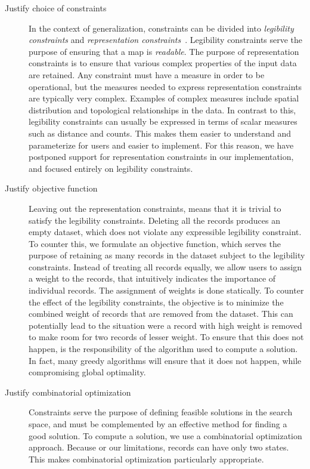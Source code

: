 \documentclass[11pt, oneside]{article}   	%
\begin{document}
\begin{description}
\item[Justify choice of constraints] 
In the context of generalization, constraints can be divided into \emph{legibility constraints} and \emph{representation constraints}~\cite{harrie2007modelling}. Legibility constraints serve the purpose of ensuring that a map is \emph{readable}. The purpose of representation constraints is to ensure that various complex properties of the input data are retained. Any constraint must have a measure in order to be operational, but the measures needed to express representation constraints are typically very complex. Examples of complex measures include spatial distribution and topological relationships in the data. In contrast to this, legibility constraints can usually be expressed in terms of scalar measures such as distance and counts. This makes them easier to understand and parameterize for users and easier to implement. For this reason, we have postponed support for representation constraints in our implementation, and focused entirely on legibility constraints.

\item[Justify objective function] Leaving out the representation constraints, means that it is trivial to satisfy the legibility constraints. Deleting all the records produces an empty dataset, which does not violate any expressible legibility constraint. To counter this, we formulate an objective function, which serves the purpose of retaining as many records in the dataset subject to the legibility constraints. Instead of treating all records equally, we allow users to assign a weight to the records, that intuitively indicates the importance of individual records. The assignment of weights is done statically. To counter the effect of the legibility constraints, the objective is to minimize the combined weight of records that are removed from the dataset. This can potentially lead to the situation were a record with high weight is removed to make room for two records of lesser weight. To ensure that this does not happen, is the responsibility of the algorithm used to compute a solution. In fact, many greedy algorithms will ensure that it does not happen, while compromising global optimality.

\item[Justify combinatorial optimization]
Constraints serve the purpose of defining feasible solutions in the search space, and must be complemented by an effective method for finding a good solution. To compute a solution, we use a combinatorial optimization approach. Because or our limitations, records can have only two states. This makes combinatorial optimization particularly appropriate.


\end{description}
\end{document}

